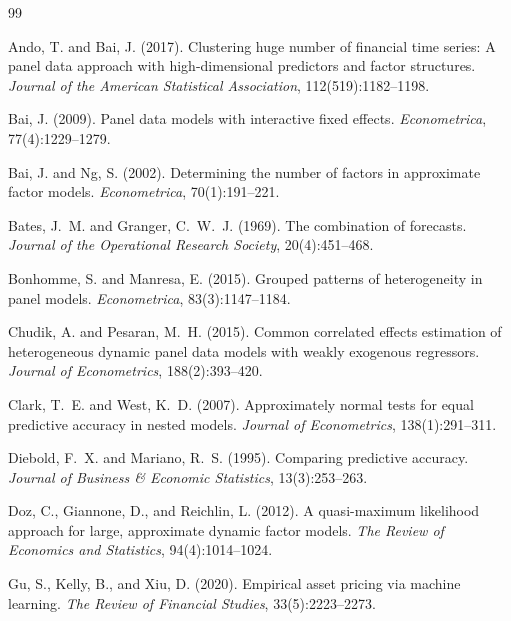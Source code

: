 \documentclass[11pt,a4paper]{article}
\begin{document}
\begin{thebibliography}{99}

Ando, T. and Bai, J. (2017).
\newblock Clustering huge number of financial time series: A panel data approach with high-dimensional predictors and factor structures.
\newblock \emph{Journal of the American Statistical Association}, 112(519):1182--1198.

Bai, J. (2009).
\newblock Panel data models with interactive fixed effects.
\newblock \emph{Econometrica}, 77(4):1229--1279.

Bai, J. and Ng, S. (2002).
\newblock Determining the number of factors in approximate factor models.
\newblock \emph{Econometrica}, 70(1):191--221.

Bates, J.~M. and Granger, C.~W.~J. (1969).
\newblock The combination of forecasts.
\newblock \emph{Journal of the Operational Research Society}, 20(4):451--468.

Bonhomme, S. and Manresa, E. (2015).
\newblock Grouped patterns of heterogeneity in panel models.
\newblock \emph{Econometrica}, 83(3):1147--1184.

Chudik, A. and Pesaran, M.~H. (2015).
\newblock Common correlated effects estimation of heterogeneous dynamic panel data models with weakly exogenous regressors.
\newblock \emph{Journal of Econometrics}, 188(2):393--420.

Clark, T.~E. and West, K.~D. (2007).
\newblock Approximately normal tests for equal predictive accuracy in nested models.
\newblock \emph{Journal of Econometrics}, 138(1):291--311.

Diebold, F.~X. and Mariano, R.~S. (1995).
\newblock Comparing predictive accuracy.
\newblock \emph{Journal of Business \& Economic Statistics}, 13(3):253--263.

Doz, C., Giannone, D., and Reichlin, L. (2012).
\newblock A quasi-maximum likelihood approach for large, approximate dynamic factor models.
\newblock \emph{The Review of Economics and Statistics}, 94(4):1014--1024.

Gu, S., Kelly, B., and Xiu, D. (2020).
\newblock Empirical asset pricing via machine learning.
\newblock \emph{The Review of Financial Studies}, 33(5):2223--2273.


\end{thebibliography}
\end{document}

